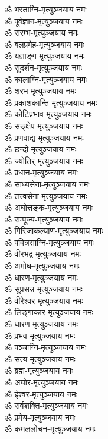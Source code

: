 \begin{multicols}{2}
\begin{flushleft}
ॐ भरताग्नि-मृत्युञ्जयाय नमः\\
ॐ पूर्वज्ञान-मृत्युञ्जयाय नमः\\
ॐ संरम्भ-मृत्युञ्जयाय नमः\\
ॐ बलप्रमेह-मृत्युञ्जयाय नमः\\
ॐ यज्ञाङ्ग-मृत्युञ्जयाय नमः\\
ॐ सुदर्शन-मृत्युञ्जयाय नमः\\
ॐ कालाग्नि-मृत्युञ्जयाय नमः\hfill{}\\
ॐ शरभ-मृत्युञ्जयाय नमः\\
ॐ प्रकाशकान्ति-मृत्युञ्जयाय नमः\\
ॐ कोटिप्रभाव-मृत्युञ्जयाय नमः\\
ॐ सङ्क्षेप-मृत्युञ्जयाय नमः\\
ॐ प्रणवाद्य-मृत्युञ्जयाय नमः\\
ॐ छन्दो-मृत्युञ्जयाय नमः\\
ॐ ज्योतिर्-मृत्युञ्जयाय नमः\\
ॐ प्रधान-मृत्युञ्जयाय नमः\\
ॐ साध्यसेना-मृत्युञ्जयाय नमः\\
ॐ तत्त्वसेना-मृत्युञ्जयाय नमः\hfill{}\\
ॐ अघोत्तङ्क-मृत्युञ्जयाय नमः\\
ॐ सम्पूज्य-मृत्युञ्जयाय नमः\\
ॐ गिरिजाकल्याण-मृत्युञ्जयाय नमः\\
ॐ पवित्रसाग्नि-मृत्युञ्जयाय नमः\\
ॐ वीरभद्र-मृत्युञ्जयाय नमः\\
ॐ अमोघ-मृत्युञ्जयाय नमः\\
ॐ धारण-मृत्युञ्जयाय नमः\\
ॐ सुप्रसन्न-मृत्युञ्जयाय नमः\\
ॐ वीरेश्वर-मृत्युञ्जयाय नमः\\
ॐ लिङ्गाकार-मृत्युञ्जयाय नमः\hfill{}\\
ॐ धारण-मृत्युञ्जयाय नमः\\
ॐ प्रभव-मृत्युञ्जयाय नमः\\
ॐ पञ्चाग्नि-मृत्युञ्जयाय नमः\\
ॐ सत्य-मृत्युञ्जयाय नमः\\
ॐ ब्रह्म-मृत्युञ्जयाय नमः\\
ॐ अघोर-मृत्युञ्जयाय नमः\\
ॐ ईश्वर-मृत्युञ्जयाय नमः\\
ॐ सर्वशक्ति-मृत्युञ्जयाय नमः\\
ॐ प्रमेय-मृत्युञ्जयाय नमः\\
ॐ कमललोचन-मृत्युञ्जयाय नमः\hfill{}\\

\end{flushleft}
\end{multicols}
